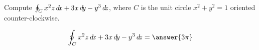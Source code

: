 \documentclass{ximera}
\author{David Guichard \and Neal Koblitz \and H. Jerome Keisler \and Albert Scheller \and Barry Balof \and Mike Wills \and Matthew Carr}
\begin{document}
\begin{exercise}




Compute $\oint_{C}x^2 z\mathop{}\!d\! x+3x\mathop{}\!d\! y-y^3\mathop{}\!d\! z$, where $C$ is the unit circle $x^2+y^2=1$ oriented counter-clockwise.

\begin{prompt}
\[
\oint_{C}x^2 z\d x+3x\d y-y^3\d z=\answer{3\pi}
\]
\end{prompt}


\end{exercise}
\end{document}
